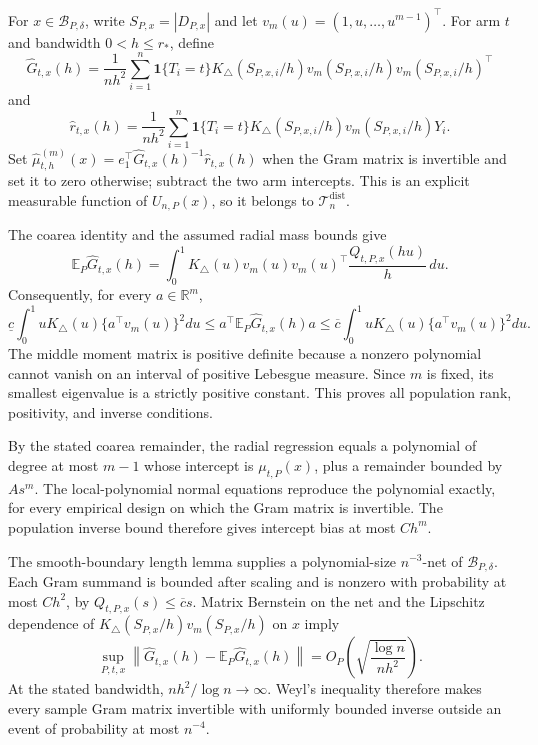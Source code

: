For \(x\in\mathcal B_{P,\delta}\), write \(S_{P,x}=|D_{P,x}|\) and let \(v_m(u)=(1,u,\ldots,u^{m-1})^\top\).  For arm \(t\) and bandwidth \(0<h\leq r_*\), define
\[
 \widehat G_{t,x}(h)=\frac1{nh^2}\sum_{i=1}^n\mathbf1\{T_i=t\}
 K_\triangle(S_{P,x,i}/h)v_m(S_{P,x,i}/h)v_m(S_{P,x,i}/h)^\top
\]
and
\[
 \widehat r_{t,x}(h)=\frac1{nh^2}\sum_{i=1}^n\mathbf1\{T_i=t\}
 K_\triangle(S_{P,x,i}/h)v_m(S_{P,x,i}/h)Y_i.
\]
Set \(\widehat\mu^{(m)}_{t,h}(x)=e_1^\top\widehat G_{t,x}(h)^{-1}\widehat r_{t,x}(h)\) when the Gram matrix is invertible and set it to zero otherwise; subtract the two arm intercepts.  This is an explicit measurable function of \(U_{n,P}(x)\), so it belongs to \(\mathcal T_n^{\mathrm{dist}}\).

The coarea identity and the assumed radial mass bounds give
\[
 \mathbb E_P\widehat G_{t,x}(h)
 =\int_0^1K_\triangle(u)v_m(u)v_m(u)^\top\frac{Q_{t,P,x}(hu)}h\,du.
\]
Consequently, for every \(a\in\mathbb R^m\),
\[
 \underline c\int_0^1uK_\triangle(u)\{a^\top v_m(u)\}^2du
 \leq a^\top\mathbb E_P\widehat G_{t,x}(h)a
 \leq\overline c\int_0^1uK_\triangle(u)\{a^\top v_m(u)\}^2du.
\]
The middle moment matrix is positive definite because a nonzero polynomial cannot vanish on an interval of positive Lebesgue measure.  Since \(m\) is fixed, its smallest eigenvalue is a strictly positive constant.  This proves all population rank, positivity, and inverse conditions.

By the stated coarea remainder, the radial regression equals a polynomial of degree at most \(m-1\) whose intercept is \(\mu_{t,P}(x)\), plus a remainder bounded by \(As^m\).  The local-polynomial normal equations reproduce the polynomial exactly, for every empirical design on which the Gram matrix is invertible.  The population inverse bound therefore gives intercept bias at most \(Ch^m\).

The smooth-boundary length lemma supplies a polynomial-size \(n^{-3}\)-net of \(\mathcal B_{P,\delta}\).  Each Gram summand is bounded after scaling and is nonzero with probability at most \(Ch^2\), by \(Q_{t,P,x}(s)\leq\overline c s\).  Matrix Bernstein on the net and the Lipschitz dependence of \(K_\triangle(S_{P,x}/h)v_m(S_{P,x}/h)\) on \(x\) imply
\[
 \sup_{P,t,x}\left\|\widehat G_{t,x}(h)-\mathbb E_P\widehat G_{t,x}(h)\right\|
 =O_P\!\left(\sqrt{\frac{\log n}{nh^2}}\right).
\]
At the stated bandwidth, \(nh^2/\log n\to\infty\).  Weyl's inequality therefore makes every sample Gram matrix invertible with uniformly bounded inverse outside an event of probability at most \(n^{-4}\).

